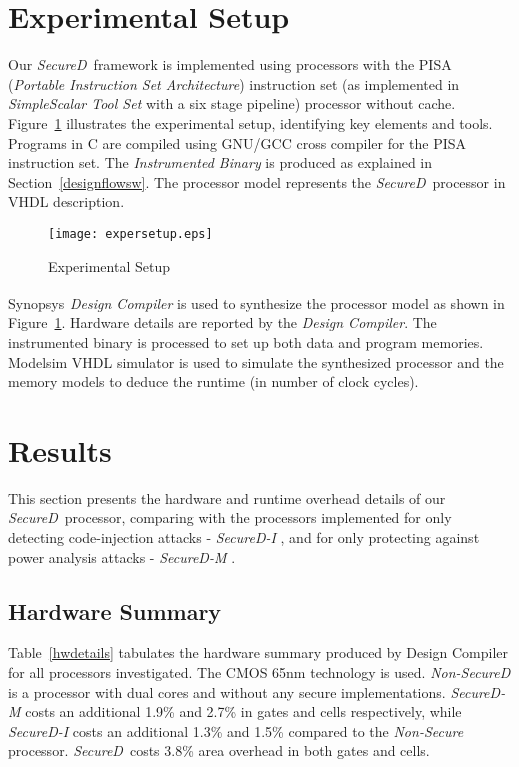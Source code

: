 \documentclass{article}
\newcommand{\reged}{\textsuperscript{\textregistered\ }}
\newcommand{\SecureD}{\emph{SecureD}}
\begin{document}
\section{Experimental Setup} \label{experSetup}
Our \SecureD\ framework is  implemented using  processors with  the PISA
(\emph{Portable Instruction Set Architecture})  instruction   set (as
implemented in \emph{SimpleScalar Tool Set} with  a         six stage
pipeline)            processor without cache. Figure~\ref{expersetup}
illustrates the experimental setup,  identifying     key elements and
tools. Programs in C are compiled using GNU/GCC   cross  compiler for
the PISA instruction set. The \emph{Instrumented  Binary} is produced  as
explained  in     Section~\ref{designflowsw}. The     processor model
represents the \SecureD\ processor in VHDL description. 

\begin{figure}[th!]
\centering
\texttt{[image: expersetup.eps]}
\caption{Experimental Setup}
\label{expersetup}
\end{figure}

Synopsys\reged \emph{Design  Compiler} is     used to  synthesize the
processor model as shown in Figure~\ref{expersetup}. Hardware details
are reported by the \emph{Design Compiler}. The instrumented   binary
is processed to set up  both   data  and    program memories. Modelsim
VHDL simulator is used to simulate the synthesized processor  and the
memory models to deduce the runtime (in number of clock cycles).


\section{Results} \label{results}
This    section presents the hardware and runtime overhead details of
our \SecureD\ processor,   comparing  with the processors implemented
for only  detecting code-injection attacks - \emph{SecureD\nobreakdash-I}
\cite{ragel06impres}, and for only protecting  against  power analysis
attacks - \emph{SecureD\nobreakdash-M} \cite{ambrose2011multiprocessor}.

\subsection{Hardware Summary} \label{hwsumm}
Table~\ref{hwdetails}   tabulates    the hardware summary produced by
Design Compiler  for       all      processors investigated. The CMOS 65nm technology is used.
\emph{Non-SecureD} is a processor with dual cores and   without   any
secure implementations. \emph{SecureD\nobreakdash-M}    costs        an
additional  1.9\%    and 2.7\% in gates and cells respectively, while
\emph{SecureD\nobreakdash-I}   costs   an     additional 1.3\% and 1.5\%
compared  to   the   \emph{Non-Secure} processor. \SecureD\ 
costs 3.8\% area overhead in both gates and cells.
\end{document}
